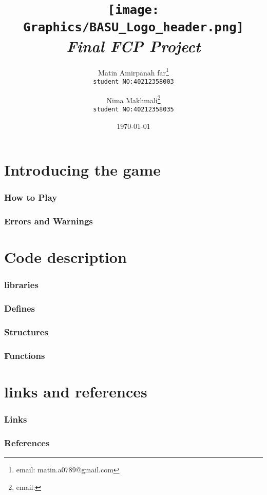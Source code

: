 \documentclass[12pt,a4paper]{article}
\title{\texttt{[image: Graphics/BASU\_Logo\_header.png]}\\[20pt] {\Huge \emph{Final FCP Project}}}
\author{Matin Amirpanah far\thanks{email: matin.a0789@gmail.com}\\
	\texttt{student NO:40212358003}\and
	Nima Makhmali\thanks{email: }\\ \texttt{student NO:40212358035}}
\date{\today}
\begin{document}
	
	\maketitle
	
	\newpage
	\tableofcontents
	
	\newpage
	\setcounter{section}{0}
	\part{Introducing the game}\label{introducing}
	
	\section{How to Play}\label{introducing.how}
	
	\section{Errors and Warnings}\label{introducing.errors}
	
	
	\newpage
	\setcounter{section}{0}
	\part{Code description}\label{description}
	
	\section{libraries}\label{description.libraries}
	
	\section{Defines}\label{description.defines}
	
	\section{Structures}\label{description.structs}
	
	\section{Functions}\label{description.func}
	
	\newpage
	\setcounter{section}{0}
	\part{links and references}\label{linkAndRef}
	
	\section{Links}\label{linkAndRef.links}
	
	\section{References}\label{linkAndRef.ref}
	
\end{document}
